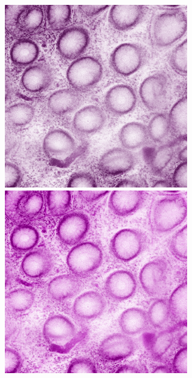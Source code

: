 \begin{figure}[H]
	\centering
	
	\begin{minipage}{0.25\columnwidth}
		\centering
		\includegraphics[clip, width=\linewidth]{fig/preprocessing/data_aug/color/SATURATION/SATURATION_0_50}
	\end{minipage}
	\begin{minipage}{0.25\columnwidth}
		\centering
		\includegraphics[clip, width=\linewidth]{fig/preprocessing/data_aug/color/SATURATION/SATURATION_1_00}

\end{minipage}
\end{figure}

